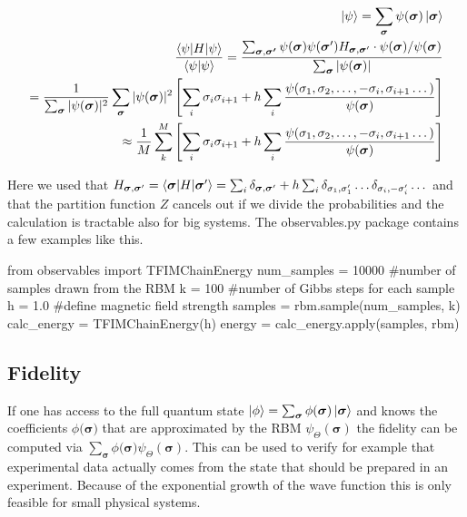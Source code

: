 \documentclass[a4paper]{article}
\begin{document}
\begin{align}
\ket{\psi} = \sum_{\bm{\sigma}} \psi(\bm{\sigma}) \ket{\bm{\sigma}} \\
\frac{\braket{\psi | H | \psi}}{\braket{\psi | \psi}} = \frac{\sum_{\bm{\sigma}, \bm{\sigma'}} \psi(\bm{\sigma}) \psi (\bm{\sigma}') H_{\bm{\sigma}, \bm{\sigma}'} \cdot \psi(\bm{\sigma}) / \psi(\bm{\sigma})}{ \sum_{\bm{\sigma}} | \psi(\bm{\sigma})|}  \\
=  \frac{1}{\sum_{\bm{\sigma}} | \psi({\bm{\sigma}} )|^2} \sum_{\bm{\sigma}} | \psi({\bm{\sigma}}) |^2 \left[ \sum_i \sigma_i \sigma_{i+1} + h \sum_i \frac{\psi(\sigma_1, \sigma_2, \dots , -\sigma_i, \sigma_{i+1} \dots)}{\psi (\bm{\sigma})} \right]\\
\approx \frac{1}{M} \sum_k^M \left[ \sum_i \sigma_i \sigma_{i+1} + h \sum_i \frac{\psi(\sigma_1, \sigma_2, \dots , -\sigma_i, \sigma_{i+1} \dots)}{\psi (\bm{\sigma})} \right]
\end{align}

Here we used that $H_{\bm{\sigma}, \bm{\sigma}'}  = \braket{\bm{\sigma} | H | \bm{\sigma}'} = \sum_i \delta_{\bm{\sigma}, \bm{\sigma}'} + h \sum_i \delta_{\sigma_1, \sigma_1'} \dots \delta_{\sigma_i, -\sigma_i'} \dots$ and that the partition function $Z$ cancels out if we divide the probabilities and the calculation is tractable also for big systems.
The observables.py package contains a few examples like this.

\begin{python}
from observables import TFIMChainEnergy
num_samples = 10000 #number of samples drawn from the RBM
k = 100 #number of Gibbs steps for each sample
h = 1.0 #define magnetic field strength
samples = rbm.sample(num_samples, k)
calc_energy = TFIMChainEnergy(h)
energy = calc_energy.apply(samples, rbm)
\end{python}

\subsection{Fidelity}

If one has access to the full quantum state $\ket{\phi} = \sum_{\bm{\sigma}} \phi(\bm{\sigma}) \ket{ \bm{\sigma}}$ and knows the coefficients $\phi(\bm{\sigma)}$ that are approximated by the RBM $\psi_{\Theta}(\bm{\sigma})$ the fidelity can be computed via $\sum_{\bm{\sigma}} \phi(\bm{\sigma)} \psi_{\Theta}(\bm{\sigma})$. This can be used to verify for example that experimental data actually comes from the state that should be prepared in an experiment. Because of the exponential growth of the wave function this is only feasible for small physical systems.
\end{document}
